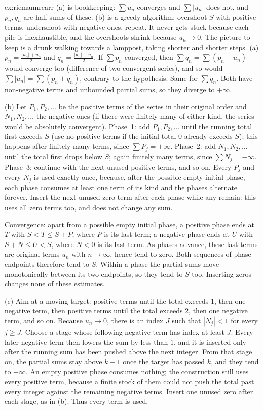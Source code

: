 \begin{solution}{ex:riemannrearr}
\idea (a) is bookkeeping: $\sum u_n$ converges and $\sum|u_n|$ does not, and $p_n,q_n$ are half-sums of these. (b) is a greedy algorithm: overshoot $S$ with positive terms, undershoot with negative ones, repeat. It never gets stuck because each pile is inexhaustible, and the overshoots shrink because $u_n\to0$. The picture to keep is a drunk walking towards a lamppost, taking shorter and shorter steps.
\writeup (a) $p_n=\frac{|u_n|+u_n}2$ and $q_n=\frac{|u_n|-u_n}2$. If $\sum p_n$ converged, then $\sum q_n=\sum(p_n-u_n)$ would converge too (difference of two convergent series), and so would $\sum|u_n|=\sum(p_n+q_n)$, contrary to the hypothesis. Same for $\sum q_n$. Both have non-negative terms and unbounded partial sums, so they diverge to $+\infty$.

(b) Let $P_1,P_2,\dots$ be the positive terms of the series in their original order and $N_1,N_2,\dots$ the negative ones (if there were finitely many of either kind, the series would be absolutely convergent). Phase~1: add $P_1,P_2,\dots$ until the running total first exceeds $S$ (use no positive terms if the initial total $0$ already exceeds $S$); this happens after finitely many terms, since $\sum P_j=+\infty$. Phase~2: add $N_1,N_2,\dots$ until the total first drops below $S$; again finitely many terms, since $\sum N_j=-\infty$. Phase~3: continue with the next unused positive terms, and so on. Every $P_j$ and every $N_j$ is used exactly once, because, after the possible empty initial phase, each phase consumes at least one term of its kind and the phases alternate forever. Insert the next unused zero term after each phase while any remain: this uses all zero terms too, and does not change any sum.

Convergence: apart from a possible empty initial phase, a positive phase ends at $T$ with $S<T\le S+P$, where $P$ is its last term; a negative phase ends at $U$ with $S+N\le U<S$, where $N<0$ is its last term. As phases advance, these last terms are original terms $u_n$ with $n\to\infty$, hence tend to zero. Both sequences of phase endpoints therefore tend to $S$. Within a phase the partial sums move monotonically between its two endpoints, so they tend to $S$ too. Inserting zeros changes none of these estimates.

(c) Aim at a moving target: positive terms until the total exceeds $1$, then one negative term, then positive terms until the total exceeds $2$, then one negative term, and so on. Because $u_n\to0$, there is an index $J$ such that $|N_j|<1$ for every $j\ge J$. Choose a stage whose following negative term has index at least $J$. Every later negative term then lowers the sum by less than $1$, and it is inserted only after the running sum has been pushed above the next integer. From that stage on, the partial sums stay above $k-1$ once the target has passed $k$, and they tend to $+\infty$. An empty positive phase consumes nothing; the construction still uses every positive term, because a finite stock of them could not push the total past every integer against the remaining negative terms. Insert one unused zero after each stage, as in (b). Thus every term is used.
\end{solution}

